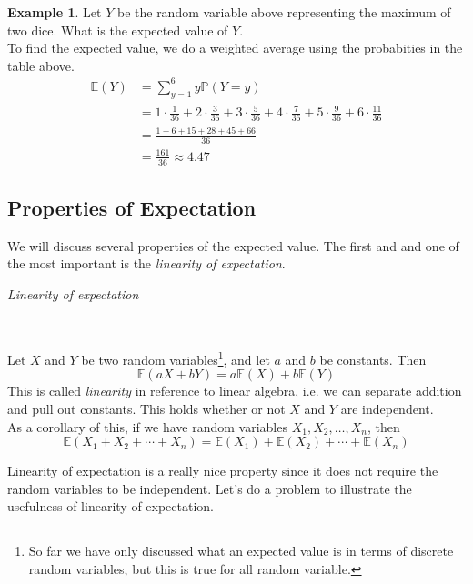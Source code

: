 \documentclass[12pt]{article}
\theoremstyle{definition}
\newtheorem*{example}{Example}
\theoremstyle{remark}
\def\P{{\mathbb P}}
\def\E{{\mathbb E}}
\begin{document}
\begin{example}Let $Y$ be the random variable above representing the maximum of two dice. What is the expected value of $Y$.\\

To find the expected value, we do a weighted average using the probabities in the table above.
\begin{align*}
\E(Y) &= \sum_{y = 1}^6 y \P(Y = y) \\
&= 1 \cdot \frac{1}{36} + 2 \cdot \frac{3}{36} + 3 \cdot \frac{5}{36} + 4 \cdot \frac{7}{36} + 5 \cdot \frac{9}{36} + 6 \cdot \frac{11}{36} \\
&= \frac{1 + 6 + 15 + 28 + 45 + 66}{36} \\
&= \frac{161}{36} \approx 4.47
\end{align*}
\end{example}

\subsection{Properties of Expectation}
We will discuss several properties of the expected value. The first and and one of the most important is the \emph{linearity of expectation}.

\begin{framed}
  \emph{Linearity of expectation}\\
  \rule{\dimexpr{}\fboxrule}{.1pt} \\
Let $X$ and $Y$ be two random variables\footnote{So far we have only discussed what an expected value is in terms of discrete random variables, but this is true for all random variable.}, and let $a$ and $b$ be constants. Then
\[
\E(aX + bY) = a\E(X) + b\E(Y)
\]
This is called \emph{linearity} in reference to linear algebra, i.e. we can separate addition and pull out constants. This holds whether or not $X$ and $Y$ are independent. \\

As a corollary of this, if we have random variables $X_1, X_2, \dots, X_n$, then
\[
\E(X_1 + X_2 + \cdots + X_n) = \E(X_1) + \E(X_2) + \cdots + \E(X_n)
\]
\end{framed}

Linearity of expectation is a really nice property since it does not require the random variables to be independent. Let's do a problem to illustrate the usefulness of linearity of expectation.
\end{document}
